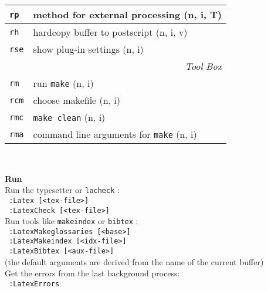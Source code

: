 \documentclass[oneside,10pt,landscape,DIV16]{scrartcl}
\newcommand{\Map}[1] {\textbf{\textasciiacute}\texttt{#1}}
\begin{document}
\begin{multicols}{3}
\begin{center}
\begin{tabular}[]{|p{11mm}|p{62mm}|}
\hline \Map{rp}   & method for external processing           \hfill (n, i, T)\\
\hline
\hline \Map{rh}   & hardcopy buffer to postscript            \hfill (n, i, v)\\
\hline \Map{rse}  & show plug-in settings                    \hfill (n, i)\\
\hline
\hline
\multicolumn{2}{|r|}{\textsl{Tool Box}} \\[1.0ex]
\hline \Map{rm}  & run \texttt{make}                        \hfill (n, i)   \\
\hline \Map{rcm} & choose makefile                          \hfill (n, i)   \\
\hline \Map{rmc} & \texttt{make clean}                      \hfill (n, i)   \\
\hline \Map{rma} & command line arguments for \texttt{make} \hfill (n, i)   \\
\hline
\end{tabular}\\[2.5ex]
%
\parbox[t][80mm][t]{70mm}{
%
\large{\textbf{Run}}\\[1.0ex]
Run the typesetter or \texttt{lacheck} : \\[1.0ex]
\texttt{ :Latex [<tex-file>]} \\[1.0ex]
\texttt{ :LatexCheck [<tex-file>]} \\[1.0ex]
Run tools like \texttt{makeindex} or \texttt{bibtex} : \\[1.0ex]
\texttt{ :LatexMakeglossaries [<base>]} \\[1.0ex]
\texttt{ :LatexMakeindex [<idx-file>]} \\[1.0ex]
\texttt{ :LatexBibtex [<aux-file>]} \\[1.0ex]
(the default arguments are derived from the name of the current buffer) \\[2.5ex]
Get the errors from the last background process: \\[1.0ex]
\texttt{ :LatexErrors} \\[2.5ex]
}
%

\end{center}
\end{multicols}
\end{document}
